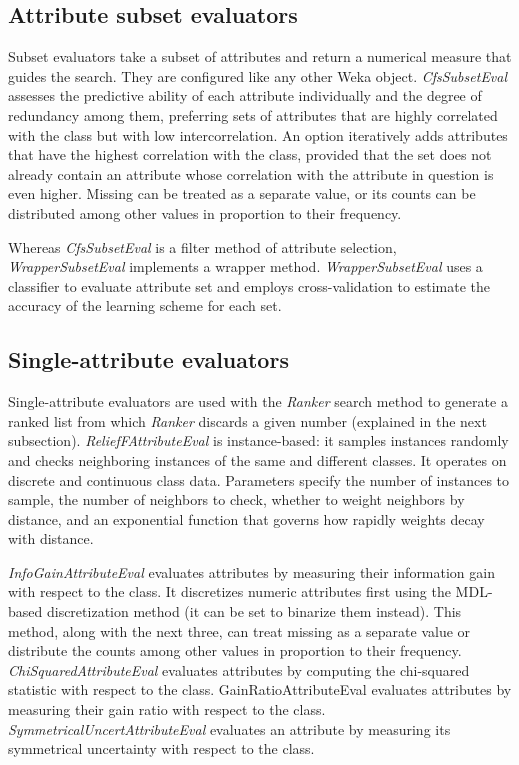 \subsection{Attribute subset evaluators}

Subset evaluators take a subset of attributes and return a numerical
measure that guides the search. They are configured like any other
Weka object. \textit{CfsSubsetEval} assesses the predictive ability of
each attribute individually and the degree of redundancy among them,
preferring sets of attributes that are highly correlated with the
class but with low intercorrelation. An option iteratively adds
attributes that have the highest correlation with the class, provided
that the set does not already contain an attribute whose correlation
with the attribute in question is even higher. Missing can be treated
as a separate value, or its counts can be distributed among other
values in proportion to their frequency.

Whereas \textit{CfsSubsetEval} is a filter method of attribute
selection, \textit{WrapperSubsetEval} implements a wrapper
method. \textit{WrapperSubsetEval} uses a classifier to evaluate
attribute set and employs cross-validation to estimate the accuracy of
the learning scheme for each set.

\subsection{Single-attribute evaluators}

Single-attribute evaluators are used with the \textit{Ranker} search
method to generate a ranked list from which \textit{Ranker} discards a
given number (explained in the next
subsection). \textit{ReliefFAttributeEval} is instance-based: it
samples instances randomly and checks neighboring instances of the
same and different classes. It operates on discrete and continuous
class data. Parameters specify the number of instances to sample, the
number of neighbors to check, whether to weight neighbors by distance,
and an exponential function that governs how rapidly weights decay
with distance.

\textit{InfoGainAttributeEval} evaluates attributes by measuring their
information gain with respect to the class. It discretizes numeric
attributes first using the MDL-based discretization method (it can be
set to binarize them instead). This method, along with the next three,
can treat missing as a separate value or distribute the counts among
other values in proportion to their
frequency. \textit{ChiSquaredAttributeEval} evaluates attributes by
computing the chi-squared statistic with respect to the
class. GainRatioAttributeEval evaluates attributes by measuring their
gain ratio with respect to the
class. \textit{SymmetricalUncertAttributeEval} evaluates an attribute
by measuring its symmetrical uncertainty with respect to the class.

